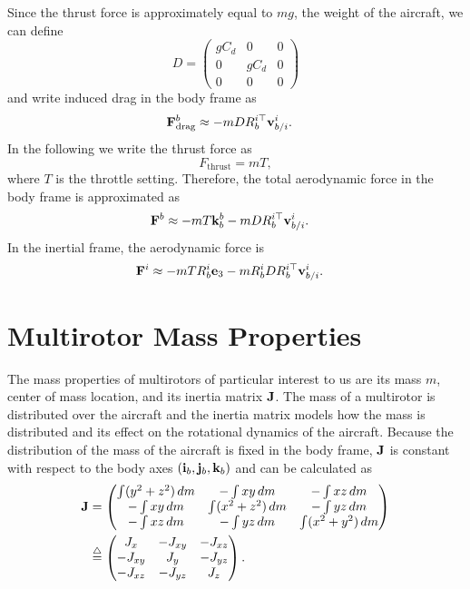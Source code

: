 Since the thrust force is approximately equal to $mg$, the weight of the aircraft, we can define
\[
D = \begin{pmatrix} gC_d & 0 & 0 \\ 0 & gC_d & 0 \\ 0 & 0 & 0 \end{pmatrix}
\]
and write induced drag in the body frame as
\begin{align*}
	\Fbf_\text{drag}^b &\approx -mD R_b^{i\top} \vbf_{b/i}^i.	\label{eq:induced drag}
\end{align*}
In the following we write the thrust force as
\[
F_{\text{thrust}} = mT,
\]
where $T$ is the throttle setting.  
%
Therefore, the total aerodynamic force in the body frame is approximated as
\begin{align}
	\mathbf{F}^b &\approx - mT \mathbf{k}_b^b - mD R_b^{i\top} \mathbf{v}_{b/i}^i.
\end{align}
In the inertial frame, the aerodynamic force is 
\begin{align}
	\mathbf{F}^i &\approx - m T R_b^i \mathbf{e}_3 - m R_b^i D R_b^{i\top} \mathbf{v}_{b/i}^i.
\end{align}


\section{Multirotor Mass Properties}
The mass properties of multirotors of particular interest to us are its mass $m$, center of mass location, and its inertia matrix $\mathbf{J}$. The mass of a multirotor is distributed over the aircraft and the inertia matrix models how the mass is distributed and its effect on the rotational dynamics of the aircraft. Because the distribution of the mass of the aircraft is fixed in the body frame, $\mathbf{J}$ is constant with respect to the body axes $(\mathbf{i}_b, \mathbf{j}_b, \mathbf{k}_b)$ and can be calculated as
\begin{align*}
\mathbf{J} &=
    \begin{pmatrix}
    \int (y^2 + z^2)\,dm & -\int xy\,dm         & -\int xz\,dm \\
    -\int xy\,dm         & \int (x^2 + z^2)\,dm &  -\int yz\,dm \\
    -\int xz\,dm         & -\int yz\,dm         & \int (x^2 + y^2)\,dm
    \end{pmatrix} \\
&\stackrel{\triangle}{=}
    \begin{pmatrix}
    J_{x}   & -J_{xy} & -J_{xz} \\
    -J_{xy} & J_{y}   & -J_{yz} \\
    -J_{xz} & -J_{yz} & J_{z}
    \end{pmatrix} .
\end{align*}

